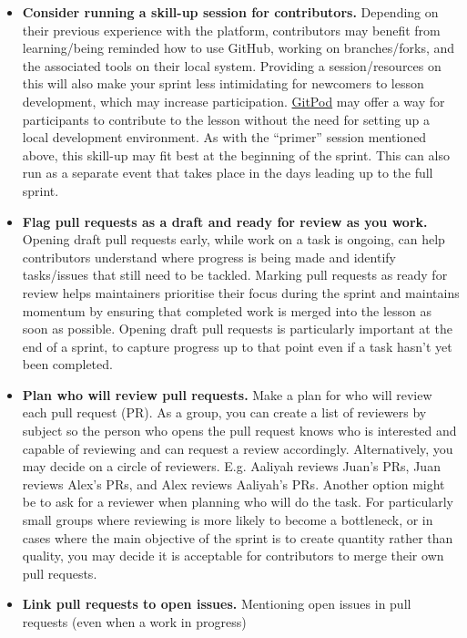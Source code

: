 \documentclass[
]{book}
\begin{document}
\begin{itemize}
\item
  \textbf{Consider running a skill-up session for contributors.}
  Depending on their previous experience with the platform,
  contributors may benefit from learning/being reminded how to use GitHub,
  working on branches/forks,
  and the associated tools on their local system.
  Providing a session/resources on this will also make your sprint less
  intimidating for newcomers to lesson development,
  which may increase participation.
  \href{https://gitpod.io/}{GitPod} may offer a way for participants to contribute to the lesson
  without the need for setting up a local development environment.
  As with the ``primer'' session mentioned above,
  this skill-up may fit best at the beginning of the sprint.
  This can also run as a separate event
  that takes place in the days leading up to the full sprint.
\item
  \textbf{Flag pull requests as a draft and ready for review as you work.}
  Opening draft pull requests early, while work on a task is ongoing,
  can help contributors understand where progress is being made and identify
  tasks/issues that still need to be tackled.
  Marking pull requests as ready for review helps maintainers prioritise their
  focus during the sprint and maintains momentum by ensuring that completed work
  is merged into the lesson as soon as possible.
  Opening draft pull requests is particularly important at the end of a sprint,
  to capture progress up to that point even if a task hasn't yet been completed.
\item
  \textbf{Plan who will review pull requests.}
  Make a plan for who will review each pull request (PR).
  As a group, you can create a list of reviewers by subject so the person who opens the pull request knows who is interested and capable of reviewing and can request a review accordingly.
  Alternatively, you may decide on a circle of reviewers. E.g. Aaliyah reviews Juan's PRs, Juan reviews Alex's PRs, and Alex reviews Aaliyah's PRs.
  Another option might be to ask for a reviewer when planning who will do the task.
  For particularly small groups where reviewing is more likely to become a bottleneck, or in cases where the main objective of the sprint is to create quantity rather than quality, you may decide it is acceptable for contributors to merge their own pull requests.
\item
  \textbf{Link pull requests to open issues.}
  Mentioning open issues in pull requests (even when a work in progress)

\end{itemize}
\end{document}
